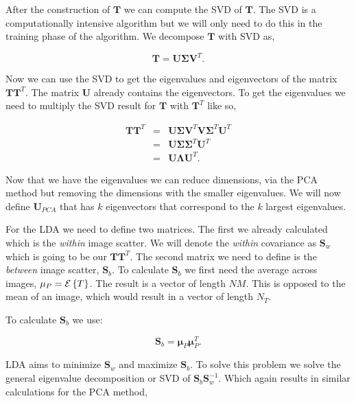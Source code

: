 After the construction of $\mathbf{T}$ we can compute the \ac{SVD} of $\mathbf{T}$. The \ac{SVD} is a computationally intensive algorithm but we will only need to do this in the training phase of the algorithm. We decompose $\mathbf{T}$ with \ac{SVD} as,

\begin{equation}
\mathbf{T}=\mathbf{U}\mathbf{\Sigma}\mathbf{V}^T.
\end{equation}

Now we can use the \ac{SVD} to get the eigenvalues and eigenvectors of the matrix $\mathbf{T}\mathbf{T}^T$. The matrix $\mathbf{U}$ already contains the eigenvectors. To get the eigenvalues we need to multiply the \ac{SVD} result for $\mathbf{T}$ with $\mathbf{T}^T$ like so,

\begin{eqnarray}
\mathbf{T}\mathbf{T}^T&=&\mathbf{U}\mathbf{\Sigma}\mathbf{V}^T\mathbf{V}\mathbf{\Sigma}^T\mathbf{U}^T\\
&=&\mathbf{U}\mathbf{\Sigma}\mathbf{\Sigma}^T\mathbf{U}^T\\
&=&\mathbf{U}\mathbf{\Lambda}\mathbf{U}^T.
\end{eqnarray}	

Now that we have the eigenvalues we can reduce dimensions, via the \ac{PCA} method but removing the dimensions with the smaller eigenvalues. We will now define $\mathbf{U}_{PCA}$ that has $k$ eigenvectors that correspond to the $k$ largest eigenvalues. 

For the \ac{LDA} we need to define two matrices. The first we already calculated which is the \emph{within} image scatter. We will denote the \emph{within} covariance as $\mathbf{S}_w$ which is going to be our $\mathbf{T}\mathbf{T}^T$. The second matrix we need to define is the \emph{between} image scatter, $\mathbf{S}_b$. To calculate $\mathbf{S}_b$ we first need the average across images, $\mathbf{\mu}_P = {\mathcal{E}}\left\{T\right\}$. The result is a vector of length $NM$. This is opposed to the mean of an image, which would result in a vector of length $N_T$.

To calculate $\mathbf{S}_b$ we use:

\begin{equation}
\mathbf{S}_b = \mathbf{\mu}_P\mathbf{\mu}^T_P.
\end{equation}

\ac{LDA} aims to minimize $\mathbf{S}_w$ and maximize $\mathbf{S}_b$. To solve this problem we solve the general eigenvalue decomposition or \ac{SVD} of $\mathbf{S}_b\mathbf{S}_w^{-1}$. Which again results in similar calculations for the \ac{PCA} method,

